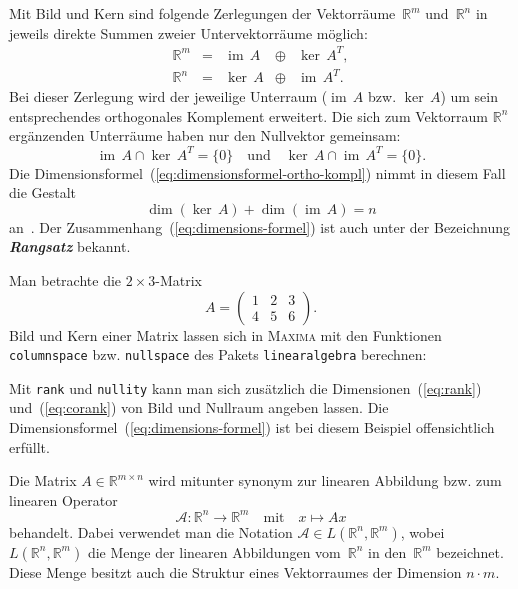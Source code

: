 \documentclass[a4paper,twoside,english,ngerman,deutsch,german,sectrefs,envcountsame,envcountchap]{svmono}
\begin{document}
Mit Bild und Kern sind folgende Zerlegungen der Vektorräume~${\mathbb{R}}^{m}$ und~${\mathbb{R}}^{n}$ in jeweils direkte Summen zweier Untervektorräume möglich:
\begin{equation}
\begin{array}{lcccc}
{\mathbb{R}}^{m} & = & {\operatorname{im}}\,A & \oplus & \ker\,A^{T},\\ {\mathbb{R}}^{n} & = & \ker\,A & \oplus & {\operatorname{im}}\,A^{T}.
\end{array}\label{eq:zerleg-im-ker}
\end{equation}
Bei dieser Zerlegung wird der jeweilige Unterraum (${\operatorname{im}}\,A$ bzw. $\ker\,A$) um sein entsprechendes orthogonales Komplement erweitert. Die sich zum Vektorraum ${\mathbb{R}}^{n}$ ergänzenden Unterräume haben nur den Nullvektor gemeinsam:
\[
{\operatorname{im}}\,A\cap\ker\,A^{T}=\{0\}\quad\text{und}\quad\ker\,A\cap{\operatorname{im}}\,A^{T}=\{0\}.
\]
Die Dimensionsformel~(\ref{eq:dimensionsformel-ortho-kompl}) nimmt in diesem Fall die Gestalt
\begin{equation}
\dim(\ker\,A)+\dim({\operatorname{im}}\,A)=n\label{eq:dimensions-formel}
\end{equation}
an~\cite{lorenz1992,beutelspacher2001}. Der Zusammenhang~(\ref{eq:dimensions-formel}) ist auch unter der Bezeichnung \textbf{\em Rangsatz} bekannt.
\begin{example}
\label{exa:Bild-und-Kern}Man betrachte die $2\times3$-Matrix
\[
A=\left(\begin{array}{ccc} 1 & 2 & 3\\ 4 & 5 & 6
\end{array}\right).
\]
Bild und Kern einer Matrix lassen sich in \textsc{Maxima} mit den Funktionen \texttt{columnspace} bzw. \texttt{nullspace} des Pakets
\texttt{linearalgebra} berechnen:



Mit \texttt{rank} und \texttt{nullity} kann man sich zusätzlich die Dimensionen~(\ref{eq:rank}) und~(\ref{eq:corank}) von Bild und Nullraum angeben lassen. Die Dimensionsformel~(\ref{eq:dimensions-formel}) ist bei diesem Beispiel offensichtlich erfüllt.

\end{example}
Die Matrix $A\in{\mathbb{R}}^{m\times n}$ wird mitunter synonym zur linearen Abbildung bzw. zum linearen Operator
\[
\mathcal{A}:{\mathbb{R}}^{n}\to{\mathbb{R}}^{m}\quad\text{mit}\quad x\mapsto Ax
\]
behandelt. Dabei verwendet man die Notation $\mathcal{A}\in L({\mathbb{R}}^{n},{\mathbb{R}}^{m})$, wobei $L({\mathbb{R}}^{n},{\mathbb{R}}^{m})$ die Menge der linearen Abbildungen vom~${\mathbb{R}}^{n}$ in den~${\mathbb{R}}^{m}$ bezeichnet. Diese Menge besitzt auch die Struktur eines Vektorraumes der Dimension $n\cdot m$.
\end{document}
